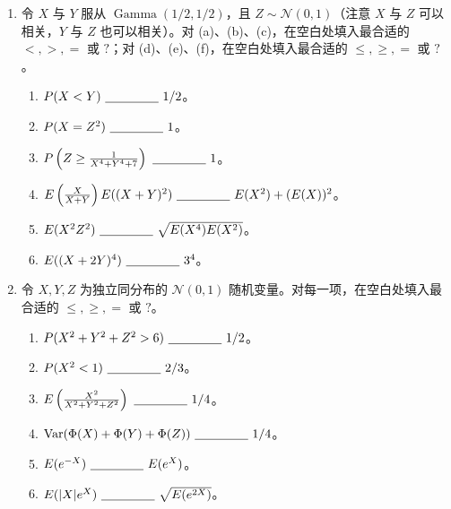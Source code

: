 \documentclass[UTF8,12pt,a4paper,fontset=fandol]{ctexart}
\begin{document}
\begin{enumerate}
  \item 令 $X$ 与 $Y$ 服从 $\operatorname{Gamma}(1/2,1/2)$，且 $Z\sim\mathcal N(0,1)$（注意 $X$ 与 $Z$ 可以相关，$Y$ 与 $Z$ 也可以相关）。对 (a)、(b)、(c)，在空白处填入最合适的 $<,>,=$ 或 $?$；对 (d)、(e)、(f)，在空白处填入最合适的 $\le,\ge,=$ 或 $?$。
  \begin{enumerate}
    \item $P(X<Y)\ \underline{\hspace{1.5cm}}\ 1/2$。
    \item $P(X=Z^2)\ \underline{\hspace{1.5cm}}\ 1$。
    \item $P\left(Z\ge \frac1{X^4+Y^4+7}\right)\ \underline{\hspace{1.5cm}}\ 1$。
    \item $E\left(\frac{X}{X+Y}\right)E((X+Y)^2)\ \underline{\hspace{1.5cm}}\ E(X^2)+(E(X))^2$。
    \item $E(X^2Z^2)\ \underline{\hspace{1.5cm}}\ \sqrt{E(X^4)E(X^2)}$。
    \item $E((X+2Y)^4)\ \underline{\hspace{1.5cm}}\ 3^4$。
  \end{enumerate}

  \item 令 $X,Y,Z$ 为独立同分布的 $\mathcal N(0,1)$ 随机变量。对每一项，在空白处填入最合适的 $\le,\ge,=$ 或 $?$。
  \begin{enumerate}
    \item $P(X^2+Y^2+Z^2>6)\ \underline{\hspace{1.5cm}}\ 1/2$。
    \item $P(X^2<1)\ \underline{\hspace{1.5cm}}\ 2/3$。
    \item $E\left(\frac{X^2}{X^2+Y^2+Z^2}\right)\ \underline{\hspace{1.5cm}}\ 1/4$。
    \item $\operatorname{Var}(\Phi(X)+\Phi(Y)+\Phi(Z))\ \underline{\hspace{1.5cm}}\ 1/4$。
    \item $E(e^{-X})\ \underline{\hspace{1.5cm}}\ E(e^X)$。
    \item $E(|X|e^X)\ \underline{\hspace{1.5cm}}\ \sqrt{E(e^{2X})}$。
  \end{enumerate}


\end{enumerate}
\end{document}
